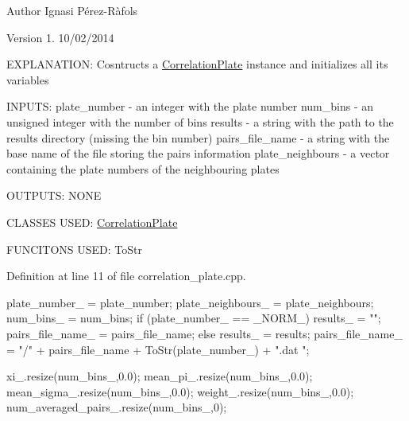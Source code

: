 \begin{DoxyAuthor}{Author}
Ignasi Pérez-\/\-Ràfols 
\end{DoxyAuthor}
\begin{DoxyVersion}{Version}
1. 10/02/2014 
\end{DoxyVersion}
E\-X\-P\-L\-A\-N\-A\-T\-I\-O\-N\-: Cosntructs a \hyperlink{class_correlation_plate}{Correlation\-Plate} instance and initializes all its variables

I\-N\-P\-U\-T\-S\-: plate\-\_\-number -\/ an integer with the plate number num\-\_\-bins -\/ an unsigned integer with the number of bins results -\/ a string with the path to the results directory (missing the bin number) pairs\-\_\-file\-\_\-name -\/ a string with the base name of the file storing the pairs information plate\-\_\-neighbours -\/ a vector containing the plate numbers of the neighbouring plates

O\-U\-T\-P\-U\-T\-S\-: N\-O\-N\-E

C\-L\-A\-S\-S\-E\-S U\-S\-E\-D\-: \hyperlink{class_correlation_plate}{Correlation\-Plate}

F\-U\-N\-C\-I\-T\-O\-N\-S U\-S\-E\-D\-: To\-Str

Definition at line 11 of file correlation\-\_\-plate.\-cpp.


\begin{DoxyCode}
                                                                               
                                                                                      
                          {
    plate_number_ = plate_number;
    plate_neighbours_ = plate_neighbours;
    num_bins_ = num_bins;
    if (plate_number_ == _NORM_){
        results_ = "";
        pairs_file_name_ = pairs_file_name;
    }
    else{
        results_ = results;
        pairs_file_name_ = "/" + pairs_file_name + ToStr(plate_number_) + ".dat
      ";
    }
    
    xi_.resize(num_bins_,0.0);
    mean_pi_.resize(num_bins_,0.0);
    mean_sigma_.resize(num_bins_,0.0);
    weight_.resize(num_bins_,0.0);
    num_averaged_pairs_.resize(num_bins_,0);

}
\end{DoxyCode}


